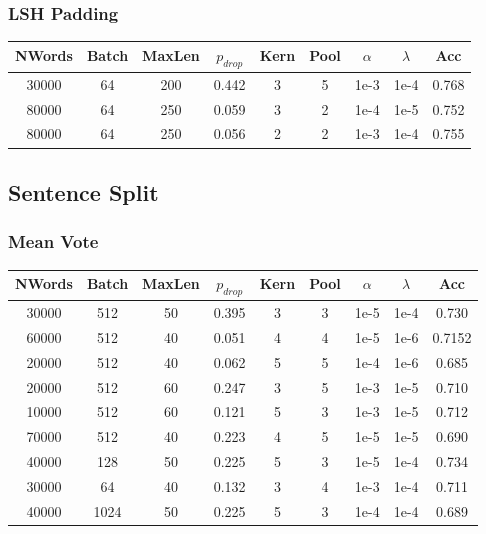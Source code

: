 \subsubsection{LSH Padding}
\begin{center}\begin{tabular}{||c c c c c c c c c ||}
 \hline
 NWords & Batch & MaxLen & $p_{drop}$ & Kern & Pool & $\alpha$ & $\lambda$ & Acc\\ [0.5ex]
 \hline\hline
 30000 & 64 & 200 & 0.442 & 3 & 5 & 1e-3 & 1e-4 & 0.768\\
 \hline
 80000 & 64 & 250 & 0.059 & 3 & 2 & 1e-4 & 1e-5 & 0.752\\
 \hline
 80000 & 64 & 250 & 0.056 & 2 & 2 & 1e-3 & 1e-4 & 0.755\\
 [1ex]\hline\end{tabular}\end{center}


\subsection{Sentence Split}
\subsubsection{Mean Vote}
\begin{center}\begin{tabular}{||c c c c c c c c c ||}
 \hline
 NWords & Batch & MaxLen & $p_{drop}$ & Kern & Pool & $\alpha$ & $\lambda$ & Acc\\ [0.5ex]
 \hline\hline
 30000 & 512 & 50 & 0.395 & 3 & 3 & 1e-5 & 1e-4 & 0.730\\
 \hline
 60000 & 512 & 40 & 0.051 & 4 & 4 & 1e-5 & 1e-6 & 0.7152\\
 \hline
 20000 & 512 & 40 & 0.062 & 5 & 5 & 1e-4 & 1e-6 & 0.685\\
 \hline
 20000 & 512 & 60 & 0.247 & 3 & 5 & 1e-3 & 1e-5 & 0.710\\
 \hline
 10000 & 512 & 60 & 0.121 & 5 & 3 & 1e-3 & 1e-5 &  0.712\\
 \hline
 70000 & 512 & 40 & 0.223 & 4 & 5 & 1e-5 & 1e-5 &  0.690\\
 \hline
 40000 & 128 & 50 & 0.225 & 5 & 3 & 1e-5 & 1e-4 &  0.734\\
 \hline
 30000 & 64 & 40 & 0.132 & 3 & 4 & 1e-3 & 1e-4 &  0.711\\
 \hline
 40000 & 1024 & 50 & 0.225 & 5 & 3 & 1e-4 & 1e-4 &  0.689\\
 [1ex]\hline\end{tabular}\end{center}

